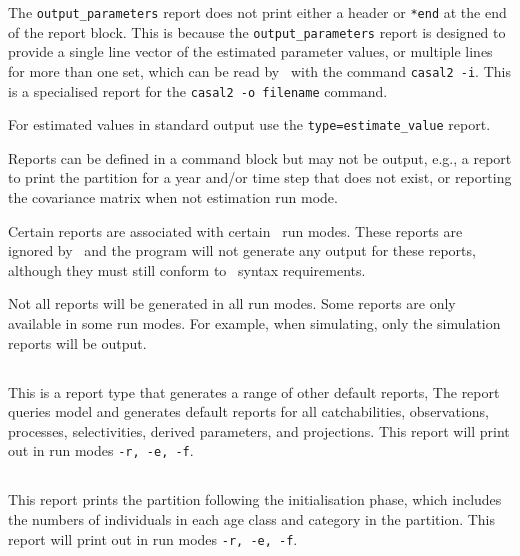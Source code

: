 The \texttt{output\_parameters} report does not print either a header or \texttt{*end} at the end of the report block. This is because the \texttt{output\_parameters} report is designed to provide a single line vector of the estimated parameter values, or multiple lines for more than one set, which can be read by \CNAME\ with the command \texttt{casal2 -i}. This is a specialised report for the \texttt{casal2 -o filename} command.

For estimated values in standard output use the \texttt{type=estimate\_value} report.

Reports can be defined in a  command block but may not be output, e.g., a report to print the partition for a year and/or time step that does not exist, or reporting the covariance matrix when not estimation run mode.

Certain reports are associated with certain \CNAME\ run modes. These reports are ignored by \CNAME\ and the program will not generate any output for these reports, although they must still conform to \CNAME\ syntax requirements.

Not all reports will be generated in all run modes. Some reports are only available in some run modes. For example, when simulating, only the simulation reports will be output.

\subsection{}\label{sec:Report-Default}

This is a report type that generates a range of other default reports, The report queries model and generates default reports for all catchabilities, observations, processes, selectivities, derived parameters, and projections. This report will print out in run modes \texttt{-r, -e, -f}.

\subsection{}\label{sec:Report-InitialisationPartition}

This report prints the partition following the initialisation phase, which includes the numbers of individuals in each age class and category in the partition. This report will print out in run modes \texttt{-r, -e, -f}.

\subsection{}\label{sec:Report-Partition}

